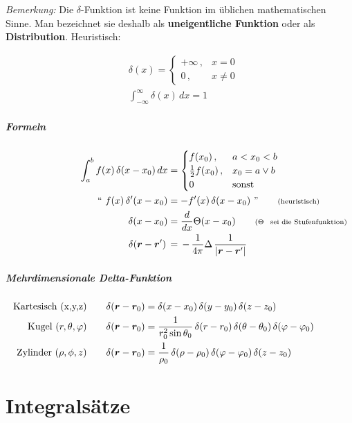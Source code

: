 \documentclass[titlepage,11pt,a4paper,ngerman]{report}
\renewcommand{\vec}[1]{\bm{#1}}
\begin{document}
\emph{Bemerkung:} Die $\delta$-Funktion ist keine Funktion im üblichen mathematischen Sinne. Man bezeichnet sie deshalb als \textbf{uneigentliche Funktion} oder als \textbf{Distribution}. Heuristisch:

\begin{align*}
&\delta(x) = 
	\begin{cases}
		+ \infty \, , & x = 0 \\
		0 \, , & x \neq 0
	\end{cases} \\
&\int_{-\infty}^{\infty} \delta (x) \, dx = 1
\end{align*}

\subparagraph{Formeln}
\begin{align*}
\int_{a}^{b} f(x) \, \delta (x-x_0) \, dx &= 
	\begin{cases}
		f(x_0) \, , & a < x_0 < b \\
		\frac{1}{2} f(x_0) \, , & x_0 = a \lor b \\
		0 \, & \text{sonst}
	\end{cases} \\
`` \ f(x) \, \delta '(x-x_0) &= -f'(x) \, \delta (x-x_0) \ " \qquad \rlap{\text{\scriptsize{(heuristisch)}}} \\
\delta (x - x_0) &= \frac{d}{dx} \Theta (x - x_0) \qquad \rlap{\scriptsize{($ \Theta $ \, \text{sei die Stufenfunktion)}}}\\
\delta(\vec{r}-\vec{r}')\,&=\,-\,\frac{1}{4\pi}\Delta\,\frac{1}{|\vec{r}-\vec{r}'|}
\end{align*} 

\subparagraph{Mehrdimensionale Delta-Funktion}
\begin{align*}\hspace{1.5cm}
\llap{\text{Kartesisch (x,y,z)}} \qquad \delta(\vec{r} - \vec{r}_0) &= \delta(x - x_0) \, \delta(y - y_0) \, \delta(z - z_0) \\
\llap{\text{Kugel $ (r, \theta, \varphi) $}} \qquad \delta(\vec{r} - \vec{r}_0) &= \frac{1}{r^2_0 \sin\theta_0} \, \delta(r - r_0) \, \delta(\theta - \theta _0) \, \delta(\varphi - \varphi _0) \\
\llap{\text{Zylinder $ (\rho , \phi , z) $}} \qquad \delta(\vec{r} - \vec{r}_0) &= \frac{1}{\rho _0} \, \delta(\rho - \rho _0) \, \delta(\varphi - \varphi _0) \, \delta(z - z _0)
\end{align*}

\section{Integralsätze}
\end{document}
